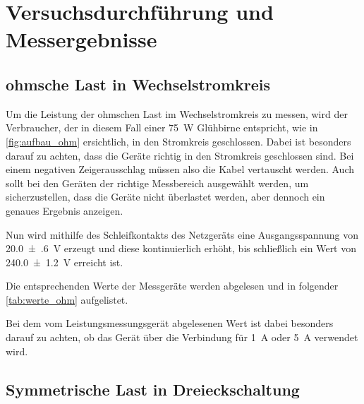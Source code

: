 \documentclass[12pt,english,ngerman]{scrartcl}
\begin{document}
\section{Versuchsdurchführung und Messergebnisse}\label{sec:versuchsdurchfuehrung_messergebnisse}

\subsection{ohmsche Last in Wechselstromkreis}

Um die Leistung der ohmschen Last im Wechselstromkreis zu messen, wird der
Verbraucher, der in diesem Fall einer \SI[]{75}{\watt} Glühbirne entspricht,
wie in \autoref{fig:aufbau_ohm} ersichtlich, in den Stromkreis geschlossen.
Dabei ist besonders darauf zu achten, dass die Geräte richtig in den Stromkreis
geschlossen sind. Bei einem negativen Zeigerausschlag müssen also die Kabel
vertauscht werden. Auch sollt bei den Geräten der richtige Messbereich
ausgewählt werden, um sicherzustellen, dass die Geräte nicht überlastet werden,
aber dennoch ein genaues Ergebnis anzeigen.

Nun wird mithilfe des Schleifkontakts des Netzgeräts eine Ausgangsspannung von
\SI[]{20.0(6)}{\volt} erzeugt und diese kontinuierlich erhöht, bis schließlich
ein Wert von \SI[]{240.0(12)}{\volt} erreicht ist.

Die entsprechenden Werte der Messgeräte werden abgelesen und in folgender
\autoref{tab:werte_ohm} aufgelistet.

Bei dem vom Leistungsmessungsgerät abgelesenen Wert ist dabei besonders darauf
zu achten, ob das Gerät über die Verbindung für \SI{1}{\ampere} oder
\SI{5}{\ampere} verwendet wird.

\begin{table}[H]
	\caption[Gemessene Werte bei der Variation der ohmschen Last]{Gemessene Werte bei der
		Variation der ohmschen Last       \\
		$U \dots$ gemessene Spannung in V \\
		$I \dots$ gemessener Strom in A   \\
		$P \dots$ gemessene Leistung in W
	}\label{tab:werte_ohm}
	\centering
	
\end{table}

\subsection{Symmetrische Last in Dreieckschaltung}
\end{document}
